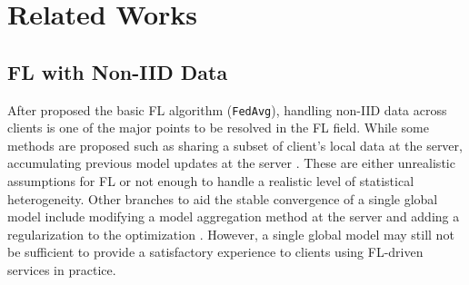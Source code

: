 \documentclass[sigconf]{acmart}
\begin{document}
\section{Related Works}
\subsection{FL with Non-IID Data} After \cite{mc+17} proposed the basic FL algorithm (\texttt{FedAvg}), handling non-IID data across clients is one of the major points to be resolved in the FL field. While some methods are proposed such as sharing a subset of client's local data at the server\cite{zhao+18}, accumulating previous model updates at the server \cite{fedavgm}. These are either unrealistic assumptions for FL or not enough to handle a realistic level of statistical heterogeneity. Other branches to aid the stable convergence of a single global model include modifying a model aggregation method at the server \cite{pfnm, fedma, pillu+19, fedbn} and adding a regularization to the optimization \cite{fedprox, ka+19, feddyn}. However, a single global model may still not be sufficient to provide a satisfactory experience to clients using FL-driven services in practice.
\end{document}
